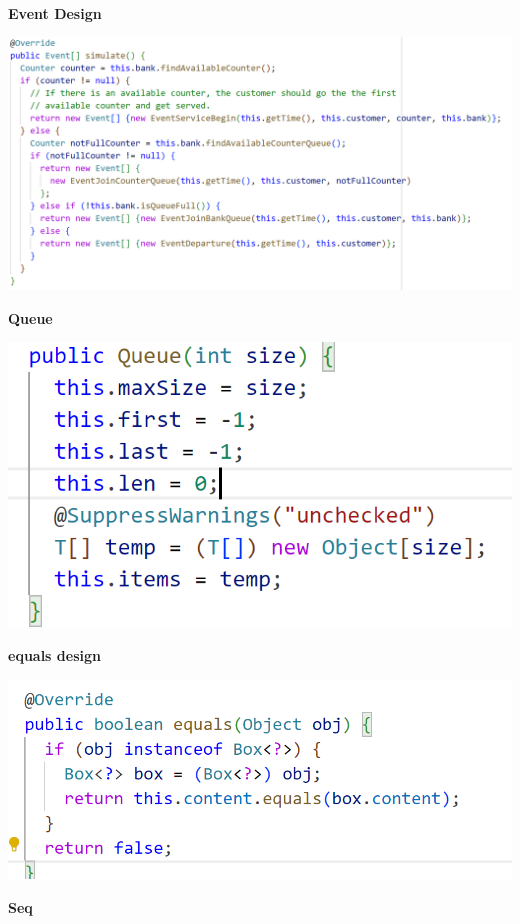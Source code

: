 \documentclass[10pt, landscape]{article}
\begin{document}
\hrulefill \\
\begin{multicols}{3}
    \textbf{Event Design}
    \centerline{\includegraphics[width=1\linewidth]{PE/PE1/images/PE1-1.png}}
    \textbf{Queue}
    \centerline{\includegraphics[width=1\linewidth]{PE/PE1/images/PE1-3.png}}
    \textbf{equals design}
    \centerline{\includegraphics[width=1\linewidth]{PE/PE1/images/PE1-4.png}}
    \textbf{Seq}

\end{multicols}
\end{document}

